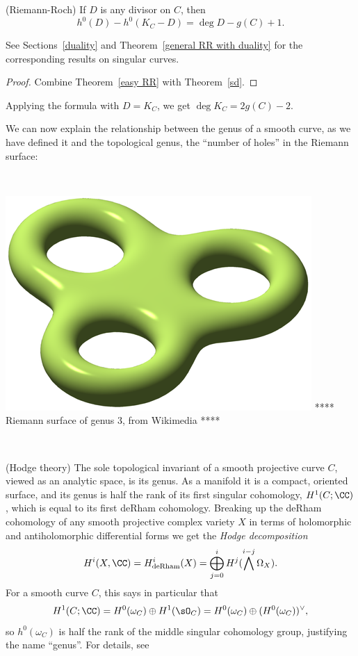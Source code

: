 \begin{theorem} (Riemann-Roch)\label{RR theorem}
If $D$ is any divisor on $C$, then 
$$
h^0(D) - h^0(K_C -D) = \deg D - g(C) +1.
$$
\end{theorem}
See Sections~\ref{duality} and Theorem~\ref{general RR with duality} for the corresponding results on singular curves.

\begin{proof}
Combine Theorem~\ref{easy RR} with Theorem~\ref{sd}.
\end{proof}
Applying the formula with $D = K_C$, we get 
$\deg K_C = 2g(C) -2$.

We can now explain the relationship between the genus of a smooth curve, as we have defined it and the 
topological genus, the ``number of holes'' in the Riemann surface:

\

\includegraphics[scale = 1]{RiemannSurface}
**** Riemann surface of genus 3, from Wikimedia ****

\

\begin{fact} (Hodge theory)
The sole topological invariant of a smooth projective curve $C$, viewed as an analytic space, is its genus. As a manifold it is a compact, oriented surface, and its genus is half the rank of its first singular cohomology, $H^{1}(C; \CC)$, which is equal to its first deRham cohomology.
Breaking up the deRham cohomology of any smooth projective complex variety $X$ in terms of holomorphic and antiholomorphic differential
forms we get the \emph{Hodge decomposition}
$$
H^i(X,\CC) = H^i_{\rm de Rham}(X) = \bigoplus_{j=0}^i H^j(\bigwedge^{i-j} \Omega_X).
$$
For a smooth curve $C$, this says in  particular that
$$
H^1(C; \CC) = H^0(\omega_C)\oplus H^1(\sO_C) = H^0(\omega_C)\oplus (H^0(\omega_C))^\vee, 
$$
so $ h^0(\omega_C)$ is half the rank of the middle singular cohomology group, justifying the name ``genus''. For details, see~\cite[p. 116]{Griffiths-Harris1978}
\end{fact}


